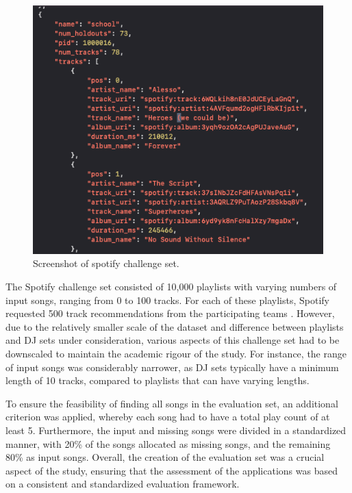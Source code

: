 \begin{figure}[H]
	\includegraphics[scale=0.5]{images/spotify_challenge_set}
	\centering
	\caption{Screenshot of spotify challenge set. \citep{aicrowd_aicrowd_2023}} 
\end{figure}

The Spotify challenge set consisted of 10,000 playlists with varying numbers of input songs, ranging from 0 to 100 tracks. For each of these playlists, Spotify requested 500 track recommendations from the participating teams \citep{aicrowd_aicrowd_2023}. However, due to the relatively smaller scale of the dataset and difference between playlists and DJ sets under consideration, various aspects of this challenge set had to be downscaled to maintain the academic rigour of the study. For instance, the range of input songs was considerably narrower, as DJ sets typically have a minimum length of 10 tracks, compared to playlists that can have varying lengths.

To ensure the feasibility of finding all songs in the evaluation set, an additional criterion was applied, whereby each song had to have a total play count of at least 5. Furthermore, the input and missing songs were divided in a standardized manner, with 20\% of the songs allocated as missing songs, and the remaining 80\% as input songs. Overall, the creation of the evaluation set was a crucial aspect of the study, ensuring that the assessment of the applications was based on a consistent and standardized evaluation framework.

